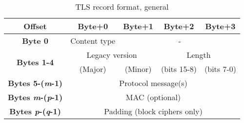 \documentclass[11pt]{scrartcl} %
\begin{document}
\begin{table}[htbp]
	\centering
	\caption{TLS record format, general}
	\begin{tabular}{|c|c|c|c|c|}
	\hline
	\textbf{Offset} & \textbf{Byte+0} & \textbf{Byte+1} & \textbf{Byte+2} & \textbf{Byte+3} \\ \hline
	\textbf{Byte 0} & Content type & \multicolumn{3}{c|}{-} \\ \hline
	\multirow{2}{*}{\textbf{Bytes 1-4}} & \multicolumn{2}{c|}{Legacy version} & \multicolumn{2}{c|}{Length} \\ \cline{2-5} 
	 & (Major) & (Minor) & (bits 15-8) & (bits 7-0) \\ \hline
	\textbf{Bytes 5-(\textit{m}-1)} & \multicolumn{4}{c|}{Protocol message(s)} \\ \hline
	\textbf{Bytes \textit{m}-(\textit{p}-1)} & \multicolumn{4}{c|}{MAC (optional)} \\ \hline
	\textbf{Bytes \textit{p}-(\textit{q}-1)} & \multicolumn{4}{c|}{Padding (block ciphers only)} \\ \hline
	\end{tabular}
\end{table}
	
	
	
\end{document}
